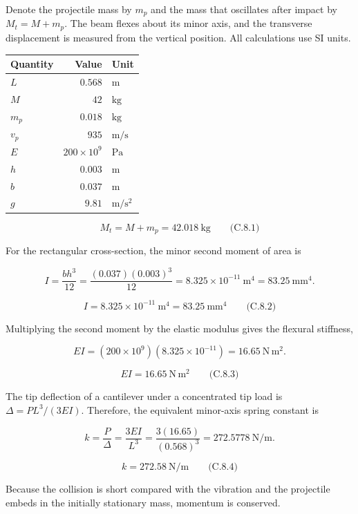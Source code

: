 Denote the projectile mass by \(m_p\) and the mass that oscillates after impact by \(M_t=M+m_p\). The beam flexes about its minor axis, and the transverse displacement is measured from the vertical position. All calculations use SI units.

\begin{center}
\small
\begin{tabular}{@{}lrl@{}}
\toprule
Quantity & Value & Unit \\
\midrule
\(L\) & \(0.568\) & \(\mathrm{m}\) \\
\(M\) & \(42\) & \(\mathrm{kg}\) \\
\(m_p\) & \(0.018\) & \(\mathrm{kg}\) \\
\(v_p\) & \(935\) & \(\mathrm{m/s}\) \\
\(E\) & \(200\times10^9\) & \(\mathrm{Pa}\) \\
\(h\) & \(0.003\) & \(\mathrm{m}\) \\
\(b\) & \(0.037\) & \(\mathrm{m}\) \\
\(g\) & \(9.81\) & \(\mathrm{m/s^2}\) \\
\bottomrule
\end{tabular}
\end{center}

\[
\boxed{M_t=M+m_p=42.018\ \mathrm{kg}}
\qquad\text{(C.8.1)}
\]

For the rectangular cross-section, the minor second moment of area is

\[
I=\frac{bh^3}{12}
=\frac{(0.037)(0.003)^3}{12}
=8.325\times10^{-11}\ \mathrm{m^4}
=83.25\ \mathrm{mm^4}.
\]

\[
\boxed{I=8.325\times10^{-11}\ \mathrm{m^4}
=83.25\ \mathrm{mm^4}}
\qquad\text{(C.8.2)}
\]

Multiplying the second moment by the elastic modulus gives the flexural stiffness,

\[
EI=(200\times10^9)(8.325\times10^{-11})
=16.65\ \mathrm{N\,m^2}.
\]

\[
\boxed{EI=16.65\ \mathrm{N\,m^2}}
\qquad\text{(C.8.3)}
\]

The tip deflection of a cantilever under a concentrated tip load is \(\Delta=PL^3/(3EI)\). Therefore, the equivalent minor-axis spring constant is

\[
k=\frac{P}{\Delta}
=\frac{3EI}{L^3}
=\frac{3(16.65)}{(0.568)^3}
=272.5778\ \mathrm{N/m}.
\]

\[
\boxed{k=272.58\ \mathrm{N/m}}
\qquad\text{(C.8.4)}
\]

Because the collision is short compared with the vibration and the projectile embeds in the initially stationary mass, momentum is conserved.

